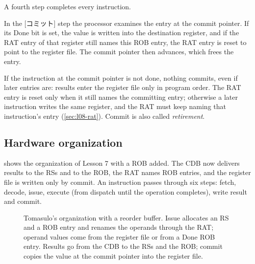 \documentclass[../main.tex]{subfiles}
\begin{document}
A fourth step completes every instruction.

\begin{definition}[Commit]
  \label{def:l08-commit}
  In the [コミット] step the
  processor examines the entry at the commit pointer.  If its Done bit is
  set, the value is written into the destination register, and if the RAT
  entry of that register still names this ROB entry, the RAT entry is reset
  to point to the register file.  The commit pointer then advances, which
  frees the entry.
\end{definition}

If the instruction at the commit pointer is not done, nothing commits, even if
later entries are: results enter the register file only in program order.  The
RAT entry is reset only when it still names the committing entry; otherwise a
later instruction writes the same register, and the RAT must keep naming that
instruction's entry (\cref{sec:l08-rat}).  Commit is also called
\emph{retirement}.

\subsection{Hardware organization}

 shows the organization of Lesson 7 with a ROB
added.  The CDB now delivers results to the RSs and to the ROB, the RAT names
ROB entries, and the register file is written only by commit.  An instruction
passes through six steps: fetch, decode, issue, execute (from dispatch until
the operation completes), write result and commit.

\begin{figure}[htbp]
  \centering
  
  \caption{Tomasulo's organization with a reorder buffer.  Issue allocates an
    RS and a ROB entry and renames the operands through the RAT; operand
    values come from the register file or from a Done ROB entry.  Results go
    from the CDB to the RSs and the ROB; commit copies the value at the commit
    pointer into the register file.}
  \label{fig:l08-organization}
\end{figure}
\end{document}
